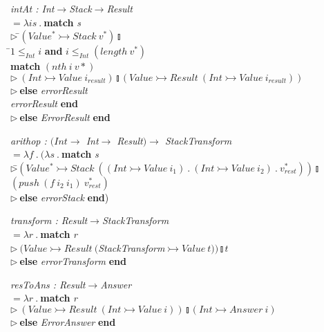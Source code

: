 \documentclass[12pt]{report}
\begin{document}
\begin{tabbing}
{\em intAt : Int$\rightarrow$Stack$\rightarrow$Result}\\
$=\lambda is\:.\:$\={\bf match} {\em s}\\
\>$\triangleright\ $\=$(Value^*\rightarrowtail Stack\ v^*)\talloblong$ \\
\> \=$1\leq_{Int}i$ {\bf and} $i\leq_{Int}(length\ v^*)$ \\
\>\> \={\bf match} $(nth\ i\ v*)$\\
\>\>\>\>$\triangleright\ (Int\rightarrowtail Value\ i_{result})\talloblong(Value\rightarrowtail Result\ (Int\rightarrowtail Value\ i_{result}))$ \\
\>\>\>\>$\triangleright\ ${\bf else} {\em errorResult}\\
\>\> {\em errorResult} {\bf end} \\
\>\>$\triangleright\ ${\bf else} {\em ErrorResult} {\bf end}
\end{tabbing}

\begin{tabbing}
{\em arithop : $(Int\rightarrow$ Int$\rightarrow$ Result$)\rightarrow$ StackTransform}\\
$=\lambda f\:.\:(\lambda s\:.\:$\={\bf match} {\em s} \\
\>$\triangleright $\=$(Value^*\rightarrowtail Stack\ ((Int\rightarrowtail Value\ i_1)\:.\:(Int\rightarrowtail Value\ i_2)\:.\:v^*_{rest}))\talloblong$ \\
\>\>$(push\ (f\ i_2\ i_1)\ v^*_{rest})$\\
\>$\triangleright\ ${\bf else} {\em errorStack} {\bf end})
\end{tabbing}

\begin{tabbing}
{\em transform : Result$\rightarrow$StackTransform}\\
$=\lambda r\:.\:$\={\bf match} {\em r} \\
\>$\triangleright\ (Value\rightarrowtail Result\ (${\em StackTransform}$\rightarrowtail Value\ t))\talloblong t$\\
\>$\triangleright\ ${\bf else} {\em errorTransform} {\bf end}
\end{tabbing}

\begin{tabbing}
{\em resToAns : Result$\rightarrow$Answer}\\
$=\lambda r\:.\:$\={\bf match} {\em r} \\
\>$\triangleright\ (Value\rightarrowtail Result\ (Int\rightarrowtail Value\ i))\talloblong(Int\rightarrowtail Answer\ i)$\\
\>$\triangleright\ ${\bf else} {\em ErrorAnswer} {\bf end}
\end{tabbing}
\end{document}
